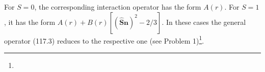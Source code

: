 For $S=0$, the corresponding interaction operator has the form $A(r)$.
For $S=1$, it has the form
$A(r)+B(r)[(\hat{\mathbf S}\mathbf n)^2-2/3]$.
In these cases the general operator (117.3) reduces to the respective one
(see Problem 1)\footnote{}.
